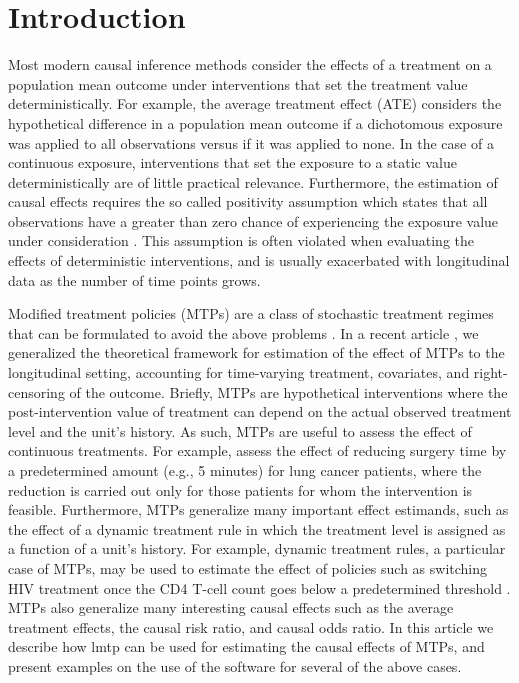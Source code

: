 \documentclass[twoside,11pt]{article}
\newcommand{\pkg}[1]{{\fontseries{b}\selectfont #1}}
\begin{document}
\section{Introduction}

Most modern causal inference methods consider the effects of a treatment on a population mean outcome under interventions that set the treatment value deterministically. For example, the average treatment effect (ATE) considers the hypothetical difference in a population mean outcome if a dichotomous exposure was applied to all observations versus if it was applied to none. In the case of a continuous exposure, interventions that set the exposure to a static value deterministically are of little practical relevance. Furthermore, the estimation of causal effects requires the so called positivity assumption which states that all observations have a greater than zero chance of experiencing the exposure value under consideration \citep{rosenbaumCentralRolePropensity1983}. This assumption is often violated when evaluating the effects of deterministic interventions, and is usually exacerbated with longitudinal data as the number of time points grows.

Modified treatment policies (MTPs) are a class of stochastic treatment regimes that can be formulated to avoid the above problems \citep{munozPopulationInterventionCausal2012, haneuseEstimationEffectInterventions2013}. In a recent article
\citep{jasaLMTP}, we generalized the theoretical framework for estimation of the effect of MTPs to the longitudinal setting, accounting for time-varying treatment, covariates, and right-censoring of the outcome. Briefly, MTPs are hypothetical interventions where the post-intervention value of treatment can depend on the actual observed treatment level and the
unit's history. As such, MTPs are useful to assess the effect of continuous treatments. For example, \citet{haneuseEstimationEffectInterventions2013} assess the effect of reducing surgery time by a predetermined amount (e.g., 5 minutes) for lung cancer patients, where the reduction is carried out only for those patients for whom the intervention is feasible. Furthermore, MTPs generalize many important effect estimands, such as the effect of a dynamic treatment rule in which the treatment level is assigned as a function of a unit's history. For example, dynamic treatment rules, a particular case of MTPs, may be used to estimate the effect of policies such as switching HIV treatment once the CD4 T-cell count goes below a predetermined threshold \citep{petersen2014delayed}. MTPs also generalize many interesting causal effects such as the average treatment effects, the causal risk ratio, and causal odds ratio. In this article we describe how \pkg{lmtp} can be used for estimating the causal effects of MTPs, and present examples on the use of the software for several of the above cases.
\end{document}
